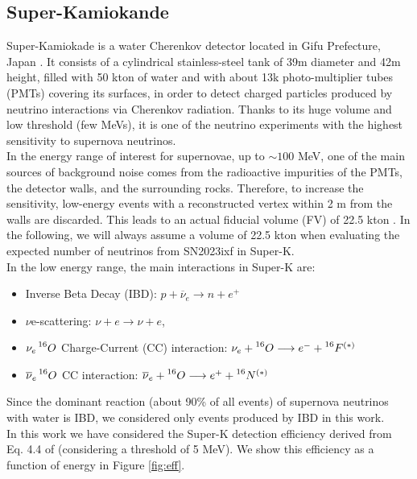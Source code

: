 \documentclass[twocolumn]{aastex631}
\begin{document}
\subsection{Super-Kamiokande}
Super-Kamiokade is a water Cherenkov detector located in Gifu Prefecture, Japan \citep{art:FUKUDA2003}. 
It consists of a cylindrical stainless-steel tank of 39m diameter and 42m height, filled with 50 kton of water and with about 13k photo-multiplier tubes (PMTs) covering its surfaces, in order to detect charged particles produced by neutrino interactions via Cherenkov radiation. Thanks to its huge volume and low threshold (few MeVs), it is one of the neutrino experiments with the highest sensitivity to supernova neutrinos. \\ In the energy range of interest for supernovae, up to $\sim100$ MeV,  one of the main sources of background noise comes from the radioactive impurities of the PMTs, the detector walls, and the surrounding rocks. Therefore, to increase the sensitivity, low-energy events with a reconstructed vertex within 2 m from the walls are discarded. This leads to an actual fiducial volume (FV) of 22.5 kton \citep{art:FUKUDA2003}.  In the following, we will always assume a volume of 22.5 kton when evaluating the expected number of neutrinos from SN2023ixf in Super-K. \\
In the low energy range, the main interactions in Super-K are: 
\begin{itemize}
    \item Inverse Beta Decay (IBD): 
    $p+\overline{\nu}_e\longrightarrow n+e^+$
    \item $\nu$e-scattering: $\nu+e\longrightarrow \nu+e$,
    \item  $\nu_e \prescript{16}{}{O}$ Charge-Current (CC) interaction: 
    $\nu_e + \prescript{16}{}{O}\longrightarrow e^- + \prescript{16}{}{F}^{(*)}$
    \item $\overline{\nu}_e \prescript{16}{}{O}$ CC interaction: 
    $\overline{\nu}_e + \prescript{16}{}{O}\longrightarrow e^+ + \prescript{16}{}{N}^{(*)}$
    
\end{itemize}

Since the dominant reaction (about 90\% of all events) of supernova neutrinos with water is IBD, we considered only events produced by IBD in this work.\\ In this work we have considered the Super-K detection efficiency derived from Eq. 4.4 of  \cite{art:vissani2022} (considering a threshold of 5 MeV). We show this efficiency as a function of energy  in Figure \ref{fig:eff}.\\
\end{document}
